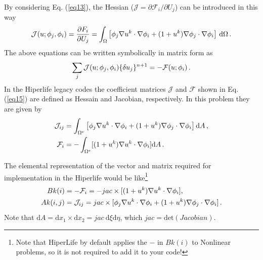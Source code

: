 \documentclass[]{article}
\begin{document}
By considering Eq. (\ref{eq13}), the Hessian ($\mathcal{J}=\partial \mathcal{F}_i/\partial U_j$) can be introduced in this way
\begin{equation}\label{eq14}
	\begin{aligned}
		\mathcal{J}(u;\phi_j,\phi_i) = {\partial F_i\over\partial U_j} = \int_\Omega \left\lbrack \phi_j \nabla u^k \cdot \nabla \phi_i + (1+u^k) \nabla \phi_j \cdot \nabla \phi_i \right\rbrack \, \mathrm{d}\Omega\thinspace .
	\end{aligned}
\end{equation}
The above equations can be written symbolically in matrix form as
\begin{equation}\label{eq15}
	\begin{aligned}
		\sum_j \mathcal{J}(u;\phi_j,\phi_i)\{\delta u_j\}^{n+1} = -\mathcal{F}(u;\phi_i)\thinspace.
	\end{aligned}
\end{equation}
In the Hiperlife legacy codes the coefficient matrices $\mathcal{J}$ and $\mathcal{F}$  shown in Eq. (\ref{eq15}) are defined as Hessain and Jacobian, respectively. In this problem they are given by
\begin{equation}\label{eq16}
	\begin{aligned}
		\mathcal{J}_{ij} &= \int_{\Omega^e} \left\lbrack \phi_j \nabla u^k \cdot \nabla \phi_i + (1+u^k) \nabla \phi_j \cdot \nabla \phi_i \right\rbrack\mathrm{d}A\thinspace,\\
		\mathcal{F}_i &=-\int_{\Omega^e} [(1+u^k)\nabla u^k\cdot \nabla \phi_i]\mathrm{d}A \thinspace.
	\end{aligned}
\end{equation}

The elemental representation of the vector and matrix required for implementation in the Hiperlife would be like\footnote{Note that HiperLife by default applies the $-$ in $Bk(i)$ to Nonlinear problems, so it is not required to add it to your code!}
\begin{equation}\label{eq17}
	\begin{aligned}[b]
		Bk(i) &= -\mathcal{F}_i = \mathcolor{red}{-}jac \times[(1+u^k)\nabla u^k\cdot \nabla \phi_i], \\
		Ak(i,j) &=  \mathcal{J}_{ij} = jac \times [\phi_j \nabla u^k \cdot \nabla \phi_i + (1+u^k) \nabla \phi_j \cdot \nabla \phi_i]\thinspace .
	\end{aligned}
\end{equation}
Note that $\mathrm{d}A=\mathrm{d}x_{1} \times \mathrm{d}x_{2}=jac \ \mathrm{d}\xi \mathrm{d}\eta$, which $jac=\mathrm{det}(Jacobian)$.
\end{document}
